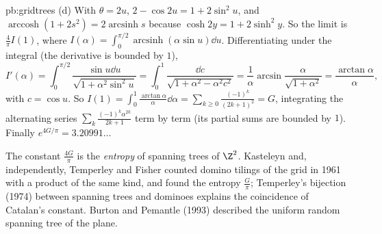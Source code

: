 \begin{solution}{pb:gridtrees}
(d) With $\theta=2u$, $2-\cos2u=1+2\sin^2u$, and $\operatorname{arccosh}(1+2s^2)=2\operatorname{arcsinh}s$ because $\cosh2y=1+2\sinh^2y$. So the limit is $\frac4\pi I(1)$, where
$I(\alpha)=\int_0^{\pi/2}\operatorname{arcsinh}(\alpha\sin u)\dd u$. Differentiating under the integral (the derivative is bounded by $1$),
\[
I'(\alpha)=\int_0^{\pi/2}\frac{\sin u\dd u}{\sqrt{1+\alpha^2\sin^2u}}=\int_0^1\frac{\dd c}{\sqrt{1+\alpha^2-\alpha^2c^2}}=\frac1\alpha\arcsin\frac\alpha{\sqrt{1+\alpha^2}}=\frac{\arctan\alpha}\alpha,
\]
with $c=\cos u$. So $I(1)=\int_0^1\frac{\arctan\alpha}\alpha\dd\alpha=\sum_{k\ge0}\frac{(-1)^k}{(2k+1)^2}=G$, integrating the alternating series $\sum_k\frac{(-1)^k\alpha^{2k}}{2k+1}$ term by term (its partial
sums are bounded by $1$). Finally $e^{4G/\pi}=3.20991\ldots$

\leads The constant $\frac{4G}\pi$ is the \emph{entropy} of spanning trees of $\Z^2$. Kasteleyn and, independently, Temperley and Fisher counted domino tilings of the grid in 1961 with a product of the same
kind, and found the entropy $\frac G\pi$; Temperley's bijection (1974) between spanning trees and dominoes explains the coincidence of Catalan's constant. Burton and Pemantle (1993) described the
uniform random spanning tree of the plane.
\end{solution}

